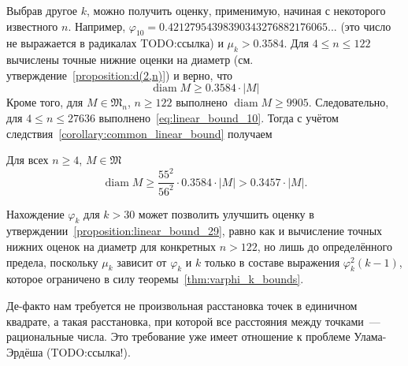 Выбрав другое $k$, можно получить оценку, применимую, начиная с некоторого известного $n$.
Например, $\varphi_{10} = 0.42127954398390343276882176065...$
(это число не выражается в радикалах TODO:ссылка) и
$\mu_k > 0.3584$.
Для $4 \leq n \leq 122$ вычислены точные нижние оценки на диаметр (см. утверждение~\ref{proposition:d(2,n)}) и верно, что
\begin{equation}
	\label{eq:linear_bound_10}
	\operatorname{diam} M \geq 0.3584 \cdot |M|
\end{equation}
Кроме того, для $M \in \mathfrak{M}_n$, $n \geq 122$ выполнено
$\operatorname{diam} M \geq 9905$.
Следовательно, для $4 \leq n \leq 27636$ выполнено~\eqref{eq:linear_bound_10}.
Тогда с учётом следствия~\ref{corollary:common_linear_bound} получаем
\begin{proposition}
	\label{proposition:linear_bound_29}
	Для всех $n \geq 4$, $M\in\mathfrak{M}$
	\begin{equation*}
		\operatorname{diam} M \geq \frac{55^2}{56^2} \cdot 0.3584 \cdot |M|
		>
		0.3457 \cdot |M|
		.
	\end{equation*}
\end{proposition}

\begin{remark}
	Нахождение $\varphi_k$ для $k > 30$ может позволить улучшить оценку в утверждении~\ref{proposition:linear_bound_29},
	равно как и вычисление точных нижних оценок на диаметр для конкретных $n>122$,
	но лишь до определённого предела, поскольку $\mu_k$ зависит от $\varphi_k$ и $k$
	только в составе выражения $\varphi_k^2 (k-1)$,
	которое ограничено в силу теоремы~\ref{thm:varphi_k_bounds}.
\end{remark}

\begin{remark}
	Де-факто нам требуется не произвольная расстановка точек в единичном квадрате,
	а такая расстановка, при которой все расстояния между точками~--- рациональные числа.
	Это требование уже имеет отношение к проблеме Улама-Эрдёша (TODO:ссылка!).
\end{remark}
